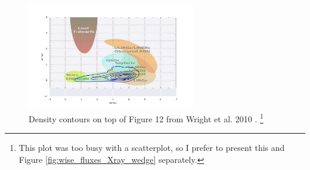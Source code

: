 \documentclass[letterpaper, oneside]{article}
\begin{document}
	\begin{figure}[H]
		\centering
		\includegraphics[width=0.65\textwidth]{../WISE_plots/color_color_top_Wright.pdf}
		\caption{Density contours on top of Figure 12 from Wright et al. 2010 \cite{Wright_2010}. \protect\footnote{This plot was too busy with a scatterplot, so I prefer to present this and Figure \ref{fig:wise_fluxes_Xray_wedge} separately.}}
		\label{fig:wise_top_Wright}
	\end{figure}
\end{document}
